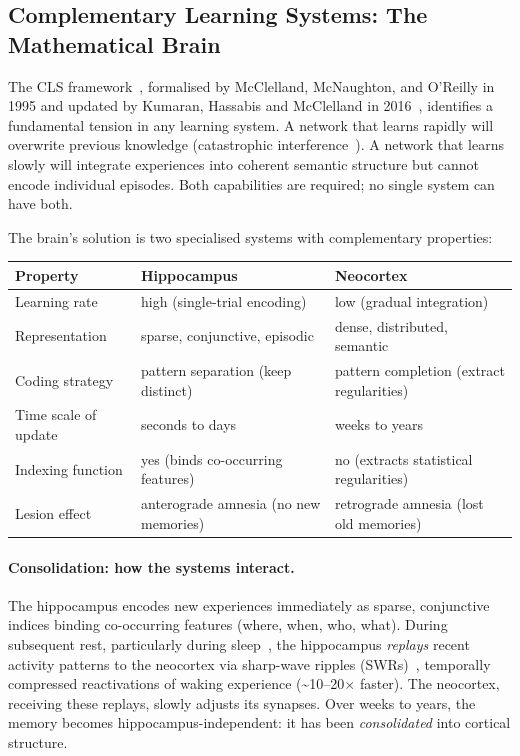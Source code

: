 \documentclass[11pt, a4paper]{article}
\theoremstyle{plain}
\theoremstyle{definition}
\theoremstyle{remark}
\begin{document}
\subsection{Complementary Learning Systems: The Mathematical Brain}

The CLS framework~\cite{mcclelland1995cls}, formalised by McClelland, McNaughton, and O'Reilly in 1995 and updated by Kumaran, Hassabis and McClelland in 2016~\cite{kumaran2016cls}, identifies a fundamental tension in any learning system.
A network that learns rapidly will overwrite previous knowledge (catastrophic interference~\cite{french1999catastrophic}).
A network that learns slowly will integrate experiences into coherent semantic structure but cannot encode individual episodes.
Both capabilities are required; no single system can have both.

The brain's solution is two specialised systems with complementary properties:

\begin{center}
\small
\begin{tabular}{p{4.5cm} p{4.5cm} p{4.5cm}}
\toprule
Property & Hippocampus & Neocortex \\
\midrule
Learning rate & high (single-trial encoding) & low (gradual integration) \\
Representation & sparse, conjunctive, episodic & dense, distributed, semantic \\
Coding strategy & pattern separation (keep distinct) & pattern completion (extract regularities) \\
Time scale of update & seconds to days & weeks to years \\
Indexing function & yes (binds co-occurring features) & no (extracts statistical regularities) \\
Lesion effect & anterograde amnesia (no new memories) & retrograde amnesia (lost old memories) \\
\bottomrule
\end{tabular}
\end{center}

\paragraph{Consolidation: how the systems interact.}
The hippocampus encodes new experiences immediately as sparse, conjunctive indices binding co-occurring features (where, when, who, what).
During subsequent rest, particularly during sleep~\cite{diekelmann2010sleep}, the hippocampus \emph{replays} recent activity patterns to the neocortex via sharp-wave ripples (SWRs)~\cite{buzsaki2015swr, wilson1994reactivation}, temporally compressed reactivations of waking experience (\textasciitilde 10--20$\times$ faster).
The neocortex, receiving these replays, slowly adjusts its synapses.
Over weeks to years, the memory becomes hippocampus-independent: it has been \emph{consolidated} into cortical structure.
\end{document}
